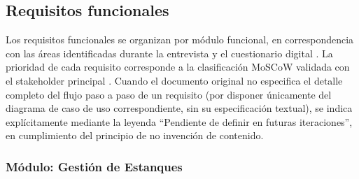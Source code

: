 \documentclass[12pt,a4paper]{article}
\begin{document}
\subsection{Requisitos funcionales}

Los requisitos funcionales se organizan por módulo funcional, en
correspondencia con las áreas identificadas durante la entrevista y el
cuestionario digital \cite{Robertson2012}. La prioridad de cada requisito
corresponde a la clasificación MoSCoW validada con el stakeholder principal
\cite{Kravchenko2022}. Cuando el documento original no especifica el detalle
completo del flujo paso a paso de un requisito (por disponer únicamente del
diagrama de caso de uso correspondiente, sin su especificación textual), se
indica explícitamente mediante la leyenda ``Pendiente de definir en futuras
iteraciones'', en cumplimiento del principio de no invención de contenido.

\subsubsection{Módulo: Gestión de Estanques}
\end{document}

